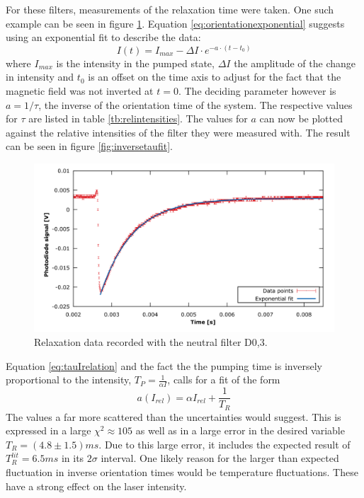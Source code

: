 For these filters, measurements of the relaxation time were taken. One such example can be seen in figure \ref{fig:dehmletexample}. Equation \ref{eq:orientationexponential} suggests using an exponential fit to describe the data:
\begin{equation}
I(t)=I_{max}-\Delta I\cdot e^{-a\cdot(t-t_0)}
\end{equation}
where $I_{max}$ is the intensity in the pumped state, $\Delta I$ the amplitude of the change in intensity and $t_0$ is an offset on the time axis to adjust for the fact that the magnetic field was not inverted at $t=0$. The deciding parameter however is $a=1/\tau$, the inverse of the orientation time of the system. The respective values for $\tau$ are listed in table \ref{tb:relintensities}. The values for $a$ can now be plotted against the relative intensities of the filter they were measured with. The result can be seen in figure \ref{fig:inversetaufit}.
\begin{figure}
\centering
\includegraphics[width=1.0\linewidth]{graphics/dehmletexample}
\caption[Example of Dehmelt relaxation]{Relaxation data recorded with the neutral filter D0,3.}
\label{fig:dehmletexample}
\end{figure}
Equation \ref{eq:tauIrelation} and the fact the the pumping time is inversely proportional to the intensity, $T_P=\frac{1}{\alpha I}$, calls for a fit of the form
\begin{equation}
a(I_{rel})=\alpha I_{rel} + \frac{1}{T_R}
\end{equation}
The values a far more scattered than the uncertainties would suggest. This is expressed in a large $\chi^2\approx105$ as well as in a large error in the desired variable $T_R=\unit{(4.8\pm1.5)}{ms}$. Due to this large error, it includes the expected result of $T_R^{lit}=\unit{6.5}{ms}$ in its $2\sigma$ interval. One likely reason for the larger than expected fluctuation in inverse orientation times would be temperature fluctuations. These have a strong effect on the laser intensity.\\
